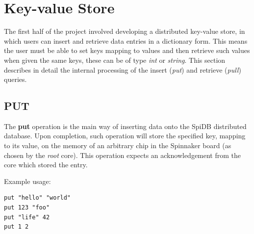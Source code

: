 
\section{Key-value Store}
The first half of the project involved developing a distributed key-value store, in which users can insert and retrieve data entries in a dictionary form. This means the user must be able to set keys mapping to values and then retrieve such values when given the same keys, these can be of type \textit{int} or \textit{string}. This section describes in detail the internal processing of the insert (\textit{put}) and retrieve (\textit{pull}) queries. 

\subsection{PUT}
The \textbf{put} operation is the main way of inserting data onto the SpiDB distributed database. 
Upon completion, such operation will store the specified key, mapping to its value, on the memory of an arbitrary chip in the Spinnaker board (as chosen by the \textit{root} core). This operation expects an acknowledgement from the core which stored the entry.

Example usage:
\begin{lstlisting}
put "hello" "world"
put 123 "foo"
put "life" 42
put 1 2
\end{lstlisting}
 

